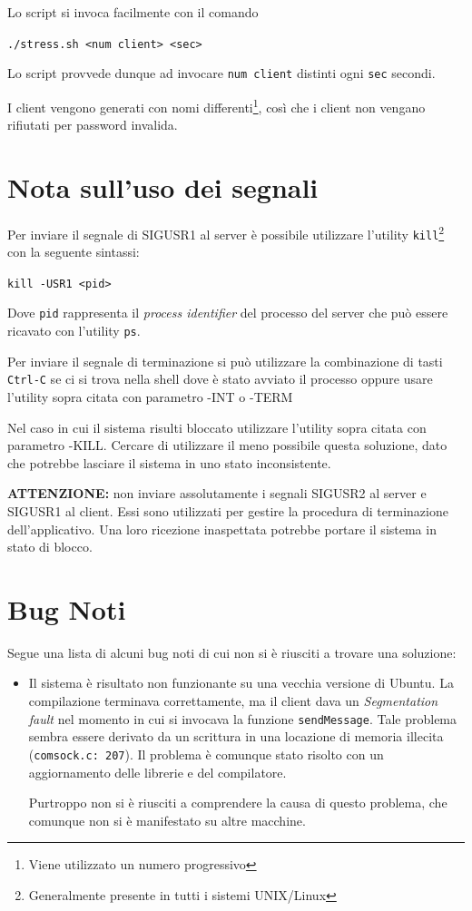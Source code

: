 \documentclass[a4paper,10pt]{article}
\begin{document}
Lo script si invoca facilmente con il comando

\begin{center}
	\texttt{./stress.sh <num client> <sec>}
\end{center}

Lo script provvede dunque ad invocare \texttt{num client} distinti ogni \texttt{sec} secondi.

I client vengono generati con nomi differenti\footnote{Viene utilizzato un numero progressivo}, cos\`i che i client non vengano rifiutati per password invalida.

\section{Nota sull'uso dei segnali}

Per inviare il segnale di SIGUSR1 al server \`e possibile utilizzare l'utility \texttt{kill}\footnote{Generalmente presente in tutti i sistemi UNIX/Linux} con la seguente sintassi:
\begin{center}
	\texttt{kill -USR1 <pid>}
\end{center}
Dove \texttt{pid} rappresenta il \textit{process identifier} del processo del server che pu\`o essere ricavato con l'utility \texttt{ps}.

Per inviare il segnale di terminazione si pu\`o utilizzare la combinazione di tasti \texttt{Ctrl-C} se ci si trova nella shell dove \`e stato avviato il processo oppure usare l'utility sopra citata con parametro -INT o -TERM

Nel caso in cui il sistema risulti bloccato utilizzare l'utility sopra citata con parametro -KILL. Cercare di utilizzare il meno possibile questa soluzione, dato che potrebbe lasciare il sistema in uno stato inconsistente.

\textbf{ATTENZIONE:} non inviare assolutamente i segnali SIGUSR2 al server e SIGUSR1 al client. Essi sono utilizzati per gestire la procedura di terminazione dell'applicativo. Una loro ricezione inaspettata potrebbe portare il sistema in stato di blocco.

\section{Bug Noti}

Segue una lista di alcuni bug noti di cui non si \`e riusciti a trovare una soluzione:
\begin{itemize}
	\item Il sistema \`e risultato non funzionante su una vecchia versione di Ubuntu. La compilazione terminava correttamente, ma il client dava un \textit{Segmentation fault} nel momento in cui si invocava la funzione \texttt{sendMessage}. Tale problema sembra essere derivato da un scrittura in una locazione di memoria illecita (\texttt{comsock.c: 207}). 
	Il problema \`e comunque stato risolto con un aggiornamento delle librerie e del compilatore.
	
	Purtroppo non si \`e riusciti a comprendere la causa di questo problema, che comunque non si \`e manifestato su altre macchine.
\end{itemize}
\end{document}
